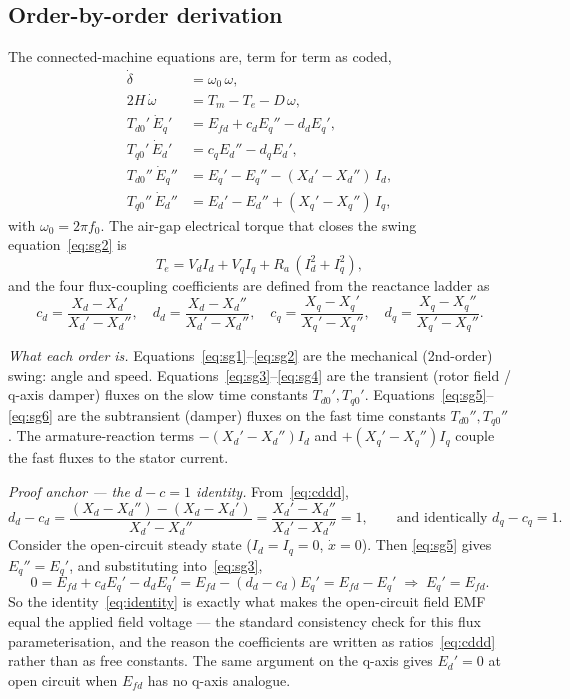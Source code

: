 \documentclass[12pt,a4paper]{article}
\begin{document}
\subsection{Order-by-order derivation}
The connected-machine equations are, term for term as coded,
\begin{align}
  \dot\delta            &= \omega_0\,\omega, \label{eq:sg1}\\
  2H\,\dot\omega        &= T_m - T_e - D\,\omega, \label{eq:sg2}\\
  T_{d0}'\,\dot{E}_q'   &= E_{fd} + c_d E_q'' - d_d E_q', \label{eq:sg3}\\
  T_{q0}'\,\dot{E}_d'   &= c_q E_d'' - d_q E_d', \label{eq:sg4}\\
  T_{d0}''\,\dot{E}_q''  &= E_q' - E_q'' - (X_d'-X_d'')\,I_d, \label{eq:sg5}\\
  T_{q0}''\,\dot{E}_d''  &= E_d' - E_d'' + (X_q'-X_q'')\,I_q, \label{eq:sg6}
\end{align}
with $\omega_0=2\pi f_0$. The air-gap electrical torque that closes the swing
equation~\eqref{eq:sg2} is
\begin{equation}
  T_e = V_d I_d + V_q I_q + R_a\,(I_d^2+I_q^2), \label{eq:sgte}
\end{equation}
and the four flux-coupling coefficients are defined from the reactance ladder as
\begin{equation}
  c_d=\frac{X_d-X_d'}{X_d'-X_d''},\quad
  d_d=\frac{X_d-X_d''}{X_d'-X_d''},\quad
  c_q=\frac{X_q-X_q'}{X_q'-X_q''},\quad
  d_q=\frac{X_q-X_q''}{X_q'-X_q''}.
  \label{eq:cddd}
\end{equation}

\emph{What each order is.}
Equations~\eqref{eq:sg1}--\eqref{eq:sg2} are the mechanical (2nd-order) swing:
angle and speed. Equations~\eqref{eq:sg3}--\eqref{eq:sg4} are the transient (rotor
field / q-axis damper) fluxes on the slow time constants $T_{d0}',T_{q0}'$.
Equations~\eqref{eq:sg5}--\eqref{eq:sg6} are the subtransient (damper) fluxes on
the fast time constants $T_{d0}'',T_{q0}''$. The armature-reaction terms
$-(X_d'-X_d'')I_d$ and $+(X_q'-X_q'')I_q$ couple the fast fluxes to the stator
current.

\emph{Proof anchor --- the $d-c=1$ identity.}
From~\eqref{eq:cddd},
\begin{equation}
  d_d-c_d=\frac{(X_d-X_d'')-(X_d-X_d')}{X_d'-X_d''}
         =\frac{X_d'-X_d''}{X_d'-X_d''}=1,
  \qquad\text{and identically } d_q-c_q=1.
  \label{eq:identity}
\end{equation}
Consider the open-circuit steady state ($I_d=I_q=0$, $\dot x=0$). Then
\eqref{eq:sg5} gives $E_q''=E_q'$, and substituting into~\eqref{eq:sg3},
\begin{equation}
  0=E_{fd}+c_d E_q'-d_d E_q'=E_{fd}-(d_d-c_d)E_q'=E_{fd}-E_q'
  \;\Longrightarrow\; E_q'=E_{fd}.
\end{equation}
So the identity~\eqref{eq:identity} is exactly what makes the open-circuit field
EMF equal the applied field voltage --- the standard consistency check for this
flux parameterisation, and the reason the coefficients are written as
ratios~\eqref{eq:cddd} rather than as free constants. The same argument on the
q-axis gives $E_d'=0$ at open circuit when $E_{fd}$ has no q-axis analogue.
\end{document}

